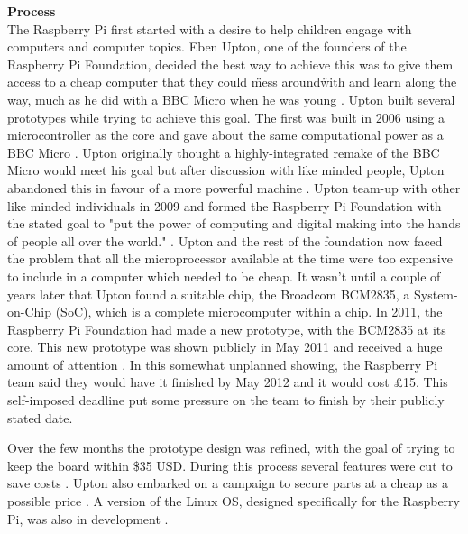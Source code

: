 \textbf{Process}\\
The Raspberry Pi first started with a desire to help children engage with computers and computer topics. Eben Upton, one of the founders of the Raspberry Pi Foundation, decided the best way to achieve this was to give them access to a cheap computer that they could \"mess around\" with and learn along the way, much as he did with a BBC Micro when he was young 
\cite{RN98}. Upton built several prototypes while trying to achieve this goal. The first was built in 2006 using a microcontroller as the core and gave about the same computational power as a BBC Micro 
\cite{RN137}. Upton originally thought a highly-integrated remake of the BBC Micro would meet his goal but after discussion with like minded people, Upton abandoned this in favour of a more powerful machine 
\cite{RN98}. Upton team-up with other like minded individuals in 2009 and formed the Raspberry Pi Foundation with the stated goal to "put the power of computing and digital making into the hands of people all over the world." 
\cite{RN138}. Upton and the rest of the foundation now faced the problem that all the microprocessor available at the time were too expensive to include in a computer which needed to be cheap. It wasn't until a couple of years later that Upton found a suitable chip, the Broadcom BCM2835, a System-on-Chip (SoC), which is a complete microcomputer within a chip. In 2011, the Raspberry Pi Foundation had made a new prototype, with the BCM2835 at its core. This new prototype was shown publicly in May 2011 and received a huge amount of attention 
\cite{RN140}. In this somewhat unplanned showing, the Raspberry Pi team said they would have it finished by May 2012 and it would cost \pounds 15. This self-imposed deadline put some pressure on the team to finish by their publicly stated date.  

Over the few months the prototype design was refined, with the goal of trying to keep the board within \$35 USD. During this process several features were cut to save costs 
\cite{RN98}. Upton also embarked on a campaign to secure parts at a cheap as a possible price 
\cite{RN98}. A version of the Linux OS, designed specifically for the Raspberry Pi, was also in development 
\cite{RN98}.

